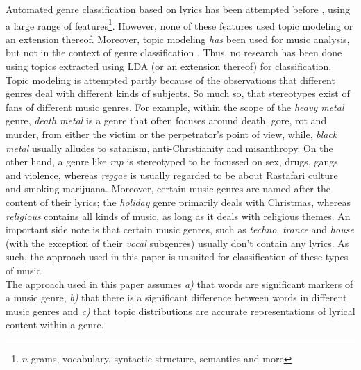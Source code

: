 
Automated genre classification based on lyrics has been attempted before \cite{fell lyrics}, using a large range of features\footnote{$n$-grams, vocabulary, syntactic structure, semantics and more}. However, none of these features used topic modeling or an extension thereof. Moreover, topic modeling \textit{has} been used for music analysis, but not in the context of genre classification \cite{lukiccomparison}. Thus, no research has been done using topics extracted using LDA (or an extension thereof) for classification. \\
Topic modeling is attempted partly because of the observations that different genres deal with different kinds of subjects. So much so, that stereotypes exist of fans of different music genres. For example, within the scope of the \textit{heavy metal} genre, \textit{death metal} is a genre that often focuses around death, gore, rot and murder, from either the victim or the perpetrator's point of view, while, \textit{black metal} usually alludes to satanism, anti-Christianity and misanthropy. On the other hand, a genre like \textit{rap} is stereotyped to be focussed on sex, drugs, gangs and violence, whereas \textit{reggae} is usually regarded to be about Rastafari culture and smoking marijuana. Moreover, certain music genres are named after the content of their lyrics; the \textit{holiday} genre primarily deals with Christmas, whereas \textit{religious} contains all kinds of music, as long as it deals with religious themes. An important side note is that certain music genres, such as \textit{techno}, \textit{trance} and \textit{house} (with the exception of their \textit{vocal} subgenres) usually don't contain any lyrics. As such, the approach used in this paper is unsuited for classification of these types of music. \\
The approach used in this paper assumes \textit{a)} that words are significant markers of a music genre, \textit{b)} that there is a significant difference between words in different music genres and \textit{c)} that topic distributions are accurate representations of lyrical content within a genre. \\
